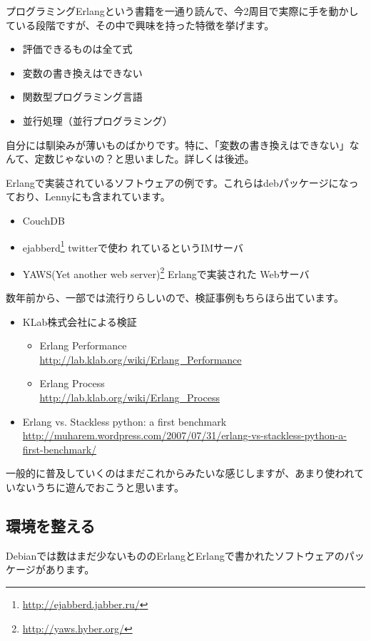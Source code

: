 \documentclass[mingoth,a4paper]{jsarticle}
\begin{document}
プログラミングErlangという書籍を一通り読んで、今2周目で実際に手を動かし
ている段階ですが、その中で興味を持った特徴を挙げます。

\begin{itemize}
 \item 評価できるものは全て式
 \item 変数の書き換えはできない
 \item 関数型プログラミング言語
 \item 並行処理（並行プログラミング）
\end{itemize}
自分には馴染みが薄いものばかりです。特に、「変数の書き換えはできない」な
んて、定数じゃないの？と思いました。詳しくは後述。

Erlangで実装されているソフトウェアの例です。これらはdebパッケージになっ
ており、Lennyにも含まれています。
\begin{itemize}
 \item CouchDB
 \item ejabberd\footnote{\url{http://ejabberd.jabber.ru/}} twitterで使わ
       れているというIMサーバ
 \item YAWS(Yet another web
       server)\footnote{\url{http://yaws.hyber.org/}} Erlangで実装された
       Webサーバ
\end{itemize}

数年前から、一部では流行りらしいので、検証事例もちらほら出ています。
\begin{itemize}
 \item KLab株式会社による検証
       \begin{itemize}
	\item Erlang Performance \\
	      \url{http://lab.klab.org/wiki/Erlang_Performance}
	\item Erlang Process \\
	      \url{http://lab.klab.org/wiki/Erlang_Process}
       \end{itemize}     
 \item Erlang vs. Stackless python: a first benchmark \\
       \url{http://muharem.wordpress.com/2007/07/31/erlang-vs-stackless-python-a-first-benchmark/}
       \end{itemize}

一般的に普及していくのはまだこれからみたいな感じしますが、あまり使われて
いないうちに遊んでおこうと思います。

\subsection{環境を整える}
Debianでは数はまだ少ないもののErlangとErlangで書かれたソフトウェアのパッ
ケージがあります。
\end{document}
